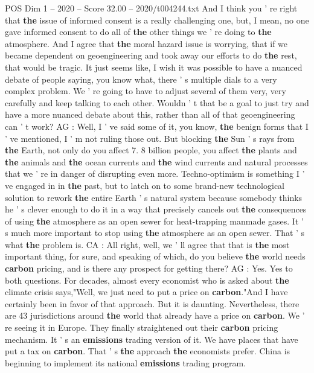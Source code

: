 \begin{textsample}{POS Dim 1 – 2020 – Score 32.00 – 2020/t004244.txt}
And I think you ' re right that \textbf{the} issue of informed consent is a really challenging one, but, I mean, no one gave informed consent to do all of \textbf{the} other things we ' re doing to \textbf{the} atmosphere.
And I agree that \textbf{the} moral hazard issue is worrying, that if we became dependent on geoengineering and took away our efforts to do \textbf{the} rest, that would be tragic.
It just seems like, I wish it was possible to have a nuanced debate of people saying, you know what, there ' s multiple dials to a very complex problem.
We ' re going to have to adjust several of them very, very carefully and keep talking to each other.
Wouldn ' t that be a goal to just try and have a more nuanced debate about this, rather than all of that geoengineering can ' t work?
AG : Well, I ' ve said some of it, you know, \textbf{the} benign forms that I ' ve mentioned, I ' m not ruling those out.
But blocking \textbf{the} Sun ' s rays from \textbf{the} Earth, not only do you affect 7. 8 billion people, you affect \textbf{the} plants and \textbf{the} animals and \textbf{the} ocean currents and \textbf{the} wind currents and natural processes that we ' re in danger of disrupting even more.
Techno-optimism is something I ' ve engaged in in \textbf{the} past, but to latch on to some brand-new technological solution to rework \textbf{the} entire Earth ' s natural system because somebody thinks he ' s clever enough to do it in a way that precisely cancels out \textbf{the} consequences of using \textbf{the} atmosphere as an open sewer for heat-trapping manmade gases.
It ' s much more important to stop using \textbf{the} atmosphere as an open sewer.
That ' s what \textbf{the} problem is.
CA : All right, well, we ' ll agree that that is \textbf{the} most important thing, for sure, and speaking of which, do you believe \textbf{the} world needs \textbf{carbon} pricing, and is there any prospect for getting there?
AG : Yes.
Yes to both questions.
For decades, almost every economist who is asked about \textbf{the} climate crisis says,"Well, we just need to put a price on \textbf{carbon}."And I have certainly been in favor of that approach.
But it is daunting.
Nevertheless, there are 43 jurisdictions around \textbf{the} world that already have a price on \textbf{carbon}.
We ' re seeing it in Europe.
They finally straightened out their \textbf{carbon} pricing mechanism.
It ' s an \textbf{emissions} trading version of it.
We have places that have put a tax on \textbf{carbon}.
That ' s \textbf{the} approach \textbf{the} economists prefer.
China is beginning to implement its national \textbf{emissions} trading program.

\end{textsample}
